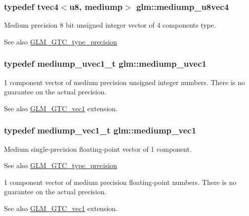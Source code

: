 \subsubsection[{mediump\+\_\+u8vec4}]{\setlength{\rightskip}{0pt plus 5cm}typedef tvec4$<${\bf u8}, mediump$>$ {\bf glm\+::mediump\+\_\+u8vec4}}\label{namespaceglm_a7f5ea1d9cc541f389e1dc8e322a7c2e6}
Medium precision 8 bit unsigned integer vector of 4 components type. \begin{DoxySeeAlso}{See also}
\hyperlink{group__gtc__type__precision}{G\+L\+M\+\_\+\+G\+T\+C\+\_\+type\+\_\+precision} 
\end{DoxySeeAlso}
\hypertarget{namespaceglm_a1fa5a5fb993ee72b4dc8d2a9caf85b26}{}
\subsubsection[{mediump\+\_\+uvec1}]{\setlength{\rightskip}{0pt plus 5cm}typedef mediump\+\_\+uvec1\+\_\+t {\bf glm\+::mediump\+\_\+uvec1}}\label{namespaceglm_a1fa5a5fb993ee72b4dc8d2a9caf85b26}
1 component vector of medium precision unsigned integer numbers. There is no guarantee on the actual precision. \begin{DoxySeeAlso}{See also}
\hyperlink{group__gtc__vec1}{G\+L\+M\+\_\+\+G\+T\+C\+\_\+vec1} extension. 
\end{DoxySeeAlso}
\hypertarget{namespaceglm_a1b734d715033ab3026b2fb27e1fb7d3e}{}
\subsubsection[{mediump\+\_\+vec1}]{\setlength{\rightskip}{0pt plus 5cm}typedef mediump\+\_\+vec1\+\_\+t {\bf glm\+::mediump\+\_\+vec1}}\label{namespaceglm_a1b734d715033ab3026b2fb27e1fb7d3e}
Medium single-\/precision floating-\/point vector of 1 component. \begin{DoxySeeAlso}{See also}
\hyperlink{group__gtc__type__precision}{G\+L\+M\+\_\+\+G\+T\+C\+\_\+type\+\_\+precision}
\end{DoxySeeAlso}
1 component vector of medium precision floating-\/point numbers. There is no guarantee on the actual precision. \begin{DoxySeeAlso}{See also}
\hyperlink{group__gtc__vec1}{G\+L\+M\+\_\+\+G\+T\+C\+\_\+vec1} extension. 
\end{DoxySeeAlso}
\hypertarget{namespaceglm_af68118a5464fb85765141f62b5894531}{}
